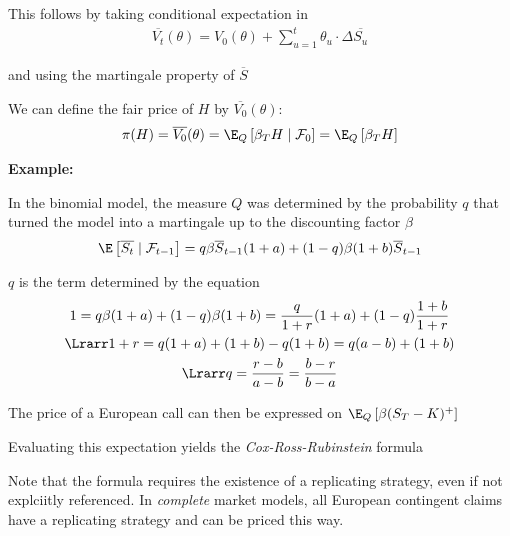 \par\bigskip
\noindent This follows by taking conditional expectation in 
\begin{equation*}
  \begin{gathered}
    \overline{V_t}(\theta) = V_0(\theta) + \sum_{u=1}^{t}\theta_u\cdot\Delta \overline{S_u}
  \end{gathered}
\end{equation*}\par
\noindent and using the martingale property of $\overline{S}$
\par\bigskip
\noindent We can define the fair price of $H$ by $\overline{V_0}(\theta)$:
\begin{equation*}
  \begin{gathered}
    \pi(H) = \overline{V_0}(\theta) = \E_Q\left[\beta_T H\mid\mathcal{F}_0\right] = \E_Q\left[\beta_T H\right]
  \end{gathered}
\end{equation*}
\par\bigskip
\noindent\textbf{Example:}\par
\noindent In the binomial model, the measure $Q$ was determined by the probability $q$ that turned the model into a martingale up to the discounting factor $\beta$
\begin{equation*}
  \begin{gathered}
    \E\left[\overline{S_t}\mid\mathcal{F}_{t-1}\right] = q\beta\overline{S}_{t-1}(1+a)+(1-q)\beta(1+b)\overline{S}_{t-1}
  \end{gathered}
\end{equation*}\par
\noindent $q$ is the term determined by the equation
\begin{equation*}
  \begin{gathered}
    1 = q\beta(1+a)+(1-q)\beta(1+b) = \dfrac{q}{1+r}(1+a)+(1-q)\dfrac{1+b}{1+r}\\
    \Lrarr 1+r = q(1+a)+(1+b)-q(1+b) = q(a-b)+(1+b)\\
    \Lrarr q = \dfrac{r-b}{a-b} = \dfrac{b-r}{b-a}
  \end{gathered}
\end{equation*}\par
\noindent The price of a European call can then be expressed on $\E_Q\left[\beta(S_T-K)^+\right]$\par
\noindent Evaluating this expectation yields the \textit{Cox-Ross-Rubinstein} formula
\par\bigskip
\noindent Note that the formula requires the existence of a replicating strategy, even if not explciitly referenced. In \textit{complete} market models, all European contingent claims have a replicating strategy and can be priced this way.
\par\bigskip
